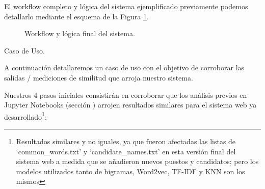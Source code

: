 \documentclass[12pt,a4paper]{article}
\makeatletter
\renewcommand\paragraph{\@startsection{paragraph}{4}{\z@}
            {-2.5ex\@plus -1ex \@minus -.25ex}
            {1.25ex \@plus .25ex}
            {\normalfont\normalsize\bfseries}}
\makeatother
\begin{document}
\begin{sloppypar}
\cleardoublepage

El workflow completo y lógica del sistema ejemplificado previamente podemos detallarlo mediante el esquema de la Figura \ref{fig:workflow_final}.

\begin{figure}[H]  
\centering
\noindent{}
\caption{Workflow y lógica final del sistema.}
\label{fig:workflow_final}
\end{figure}

\cleardoublepage

\paragraph{Caso de Uso.}\label{casodeuso}

A continuación detallaremos un caso de uso con el objetivo de corroborar las salidas / mediciones de similitud que arroja nuestro sistema.

Nuestros 4 pasos iniciales consistirán en corroborar que los análisis previos en Jupyter Notebooks (sección \textit{}) arrojen resultados similares para el sistema web ya desarrollado\footnote{Resultados similares y no iguales, ya que fueron afectadas las listas de ‘common\_words.txt’ y ‘candidate\_names.txt’ en esta versión final del sistema web a medida que se añadieron nuevos puestos y candidatos; pero los modelos utilizados tanto de bigramas, Word2vec, TF-IDF y KNN son los mismos}: 


\end{sloppypar}
\end{document}
